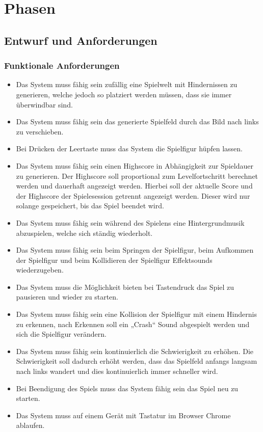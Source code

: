 \chapter{Phasen}
\section{Entwurf und Anforderungen}
\subsection{Funktionale Anforderungen}
\begin{itemize}
	\item Das System muss fähig sein zufällig eine Spielwelt mit Hindernissen zu generieren, welche jedoch so platziert werden müssen, dass sie immer überwindbar sind.
	\item Das System muss fähig sein das generierte Spielfeld durch das Bild nach links zu verschieben.
	\item Bei Drücken der Leertaste muss das System die Spielfigur hüpfen lassen.
	\item Das System muss fähig sein einen Highscore in Abhängigkeit zur Spieldauer zu generieren. Der Highscore soll proportional zum Levelfortschritt berechnet werden und dauerhaft angezeigt werden. Hierbei soll der aktuelle Score und der Highscore der Spielesession getrennt angezeigt werden. Dieser wird nur solange gespeichert, bis das Spiel beendet wird.
	\item Das System muss fähig sein während des Spielens eine Hintergrundmusik abzuspielen, welche sich ständig wiederholt.
	\item Das System muss fähig sein beim Springen der Spielfigur, beim Aufkommen der Spielfigur und beim Kollidieren der Spielfigur Effektsounds   wiederzugeben.
	\item Das System muss die Möglichkeit bieten bei Tastendruck das Spiel zu pausieren und wieder zu starten.
	\item Das System muss fähig sein eine Kollision der Spielfigur mit einem Hindernis zu erkennen, nach Erkennen soll ein „Crash“ Sound abgespielt werden und sich die Spielfigur verändern.
	\item Das System muss fähig sein kontinuierlich die Schwierigkeit zu erhöhen. Die Schwierigkeit soll dadurch erhöht werden, dass das Spielfeld anfangs langsam nach links wandert und dies kontinuierlich immer schneller wird.
	\item Bei Beendigung des Spiels muss das System fähig sein das Spiel neu zu starten. 
	\item Das System muss auf einem Gerät mit Tastatur im Browser Chrome ablaufen.
\end{itemize}
